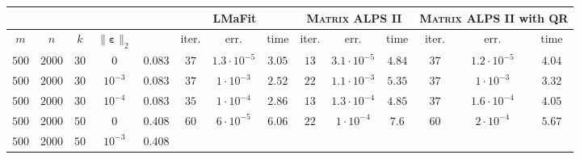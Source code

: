 \documentclass[twocolumn]{svjour3}
\newcommand{\vectornormbig}[1]{\big\|#1\big\|}
\newcommand{\noise}{\boldsymbol{\varepsilon}}
\newcommand{\rank}{k}
\begin{document}
\begin{table*} [!htp]
\begin{center}
\begin{tabular}{|c|c|c|c|c|c|c|c|c|c|c|c|c|c}
\multicolumn{4}{c|}{} & & \multicolumn{3}{|c|}{LMaFit} & \multicolumn{3}{|c}{\textsc{Matrix ALPS II}} & \multicolumn{3}{|c}{\textsc{Matrix ALPS II} with QR}  \\
\hline \hline
\multicolumn{1}{c}{$m$}  & \multicolumn{1}{c}{$n$} & \multicolumn{1}{c}{$\rank$} & \multicolumn{1}{c|}{$\vectornormbig{\noise}_2$} & & 
\multicolumn{1}{|c}{\rm{iter.}} & \multicolumn{1}{c}{\rm{err.}} & \multicolumn{1}{c|}{\rm{time}} &
\multicolumn{1}{|c}{\rm{iter.}} & \multicolumn{1}{c}{\rm{err.}} & \multicolumn{1}{c|}{\rm{time}} &
\multicolumn{1}{|c}{\rm{iter.}} & \multicolumn{1}{c}{\rm{err.}} & \multicolumn{1}{c}{\rm{time}}  \\
\hline\hline
\multicolumn{1}{c}{$500$} & \multicolumn{1}{c}{$2000$} & \multicolumn{1}{c}{$30$}  & \multicolumn{1}{c|}{$0$} & $ 0.083 $ & 
\multicolumn{1}{|c}{$37$} & \multicolumn{1}{c}{$1.3 \cdot 10^{-5}$} & \multicolumn{1}{c|}{$3.05$} &
\multicolumn{1}{|c}{$13$} & \multicolumn{1}{c}{$3.1 \cdot 10^{-5}$} & \multicolumn{1}{c}{$4.84$} &
\multicolumn{1}{|c}{$37$} & \multicolumn{1}{c}{$1.2 \cdot 10^{-5}$} & \multicolumn{1}{c}{$4.04$} \\
\hline
\multicolumn{1}{c}{$500$} & \multicolumn{1}{c}{$2000$} & \multicolumn{1}{c}{$30$}  & \multicolumn{1}{c|}{$10^{-3}$} & $ 0.083 $ & 
\multicolumn{1}{|c}{$37$} & \multicolumn{1}{c}{$1 \cdot 10^{-3}$} & \multicolumn{1}{c|}{$2.52$} &
\multicolumn{1}{|c}{$22$} & \multicolumn{1}{c}{$1.1 \cdot 10^{-3}$} & \multicolumn{1}{c}{$5.35$} &
\multicolumn{1}{|c}{$37$} & \multicolumn{1}{c}{$1 \cdot 10^{-3}$} & \multicolumn{1}{c}{$3.32$} \\
\hline
\multicolumn{1}{c}{$500$} & \multicolumn{1}{c}{$2000$} & \multicolumn{1}{c}{$30$}  & \multicolumn{1}{c|}{$10^{-4}$} & $ 0.083 $ & 
\multicolumn{1}{|c}{$35$} & \multicolumn{1}{c}{$1 \cdot 10^{-4}$} & \multicolumn{1}{c|}{$2.86$} &
\multicolumn{1}{|c}{$13$} & \multicolumn{1}{c}{$1.3 \cdot 10^{-4}$} & \multicolumn{1}{c}{$4.85$} &
\multicolumn{1}{|c}{$37$} & \multicolumn{1}{c}{$1.6 \cdot 10^{-4}$} & \multicolumn{1}{c}{$4.05$} \\
\hline
\multicolumn{1}{c}{$500$} & \multicolumn{1}{c}{$2000$} & \multicolumn{1}{c}{$50$}  & \multicolumn{1}{c|}{$0$} & $0.408 $ & 
\multicolumn{1}{|c}{$60$} & \multicolumn{1}{c}{$6 \cdot 10^{-5}$} & \multicolumn{1}{c|}{$6.06$} &
\multicolumn{1}{|c}{$22$} & \multicolumn{1}{c}{$1 \cdot 10^{-4}$} & \multicolumn{1}{c}{$7.6$} &
\multicolumn{1}{|c}{$60$} & \multicolumn{1}{c}{$2 \cdot 10^{-4}$} & \multicolumn{1}{c}{$\mathbf{5.67}$} \\
\hline
\multicolumn{1}{c}{$500$} & \multicolumn{1}{c}{$2000$} & \multicolumn{1}{c}{$50$}  & \multicolumn{1}{c|}{$10^{-3}$} & $ 0.408 $ & 

\end{tabular}
\end{center}
\end{table*}
\end{document}
